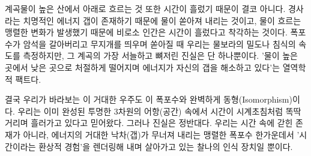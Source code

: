 계곡물이 높은 산에서 아래로 흐르는 것 또한 시간이 흘렀기 때문이 결코 아니다. 경사라는 치명적인 에너지 갭이 존재하기 때문에 물이 쏟아져 내리는 것이고, 물이 흐르는 맹렬한 변화가 발생했기 때문에 비로소 인간은 시간이 흘렀다고 착각하는 것이다. 폭포수가 암석을 갈아버리고 무지개를 띄우며 쏟아질 때 우리는 물보라의 밀도나 침식의 속도를 측정하지만, 그 계곡의 가장 서늘하고 뼈저린 진실은 단 하나뿐이다. '물이 높은 곳에서 낮은 곳으로 처절하게 떨어지며 에너지가 자신의 갭을 해소하고 있다'는 열역학적 팩트다.

결국 우리가 바라보는 이 거대한 우주도 이 폭포수와 완벽하게 동형(Isomorphism)이다. 우리는 이미 완성된 투명한 3차원의 어항(공간) 속에서 시간이 시계초침처럼 똑딱거리며 흘러가고 있다고 믿어왔다. 그러나 진실은 정반대다. 우리는 시간 속에 갇힌 존재가 아니라, 에너지의 거대한 낙차(갭)가 무너져 내리는 맹렬한 폭포수 한가운데서 '시간이라는 환상적 경험'을 렌더링해 내며 살아가고 있는 찰나의 인식 장치일 뿐이다.
